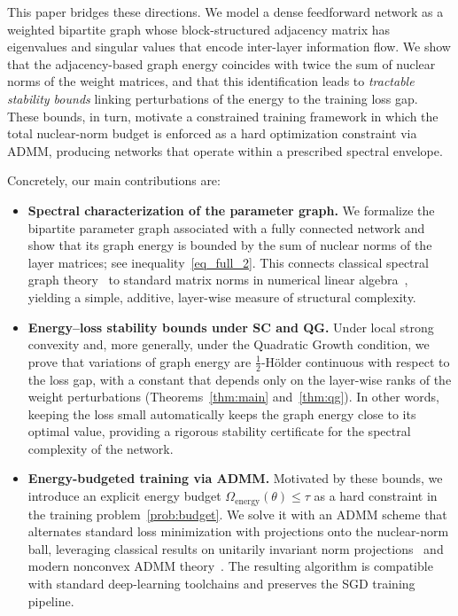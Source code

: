 \documentclass[a4paper,fleqn]{cas-sc}
\theoremstyle{remark}
\theoremstyle{definition}
\begin{document}
This paper bridges these directions. We model a dense feedforward network as a weighted bipartite graph whose block-structured adjacency matrix has eigenvalues and singular values that encode inter-layer information flow. We show that the adjacency-based graph energy coincides with twice the sum of nuclear norms of the weight matrices, and that this identification leads to \emph{tractable stability bounds} linking perturbations of the energy to the training loss gap. These bounds, in turn, motivate a constrained training framework in which the total nuclear-norm budget is enforced as a hard optimization constraint via ADMM, producing networks that operate within a prescribed spectral envelope.

Concretely, our main contributions are:
\begin{itemize}
	\item \textbf{Spectral characterization of the parameter graph.}
	We formalize the bipartite parameter graph associated with a fully connected network and show that its graph energy is bounded by the sum of nuclear norms of the layer matrices; see inequality~\eqref{eq_full_2}. This connects classical spectral graph theory~\cite{Gutman2012,GutmanZhou2012} to standard matrix norms in numerical linear algebra~\cite{golub2013matrix,HornJohnson2012,Bhatia1997}, yielding a simple, additive, layer-wise measure of structural complexity.
	
	\item \textbf{Energy--loss stability bounds under SC and QG.}
	Under local strong convexity and, more generally, under the Quadratic Growth condition, we prove that variations of graph energy are $\frac{1}{2}$-H\"older continuous with respect to the loss gap, with a constant that depends only on the layer-wise ranks of the weight perturbations (Theorems~\ref{thm:main} and~\ref{thm:qg}). In other words, keeping the loss small automatically keeps the graph energy close to its optimal value, providing a rigorous stability certificate for the spectral complexity of the network.
	
	\item \textbf{Energy-budgeted training via ADMM.}
	Motivated by these bounds, we introduce an explicit energy budget $\Omega_{\text{energy}}(\theta)\le\tau$ as a hard constraint in the training problem~\eqref{prob:budget}. We solve it with an ADMM scheme that alternates standard loss minimization with projections onto the nuclear-norm ball, leveraging classical results on unitarily invariant norm projections~\cite{Watson1992Subdiff,Duchi2008L1proj,Cai2010SVT} and modern nonconvex ADMM theory~\cite{Boyd2011ADMM,HongLuoRazaviyayn2016ADMM,WangYinZeng2019ADMM}. The resulting algorithm is compatible with standard deep-learning toolchains and preserves the SGD training pipeline.
	

\end{itemize}
\end{document}
